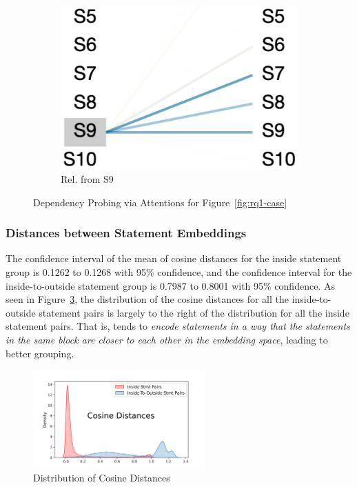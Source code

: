 \begin{figure}
\begin{subfigure}[b]{0.15\textwidth}
         \includegraphics[width=\textwidth]{sec9-fig3.png}
         \caption{Rel. from S9}
         \label{fig:stmt-9}
     \end{subfigure}
     \vspace{-12pt}
        \caption{Dependency Probing via Attentions for Figure~\ref{fig:rq1-case}}
        \label{fig:rq4-attention}
\end{figure}


\subsubsection{Distances between Statement Embeddings}
The confidence interval of the mean of cosine distances for the inside
statement group is 0.1262 to 0.1268 with 95\% confidence, and the
confidence interval for the inside-to-outside statement group is
0.7987 to 0.8001 with 95\% confidence. As seen in
Figure~\ref{fig:rq4-density}, the distribution of the cosine distances
for all the inside-to-outside statement pairs is largely to the right
of the distribution for all the inside statement pairs. That is,
{\tool} tends to {\em encode statements in a way that the statements
  in the same  block are closer to each other in the
  embedding space}, leading to better grouping.
  
\begin{figure}[t]
 	\centering
 	\includegraphics[width=2.6in]{rq4-density-v2.png}
        \vspace{-12pt}
 	\caption{Distribution of Cosine Distances}
 	\label{fig:rq4-density}	
\end{figure}




